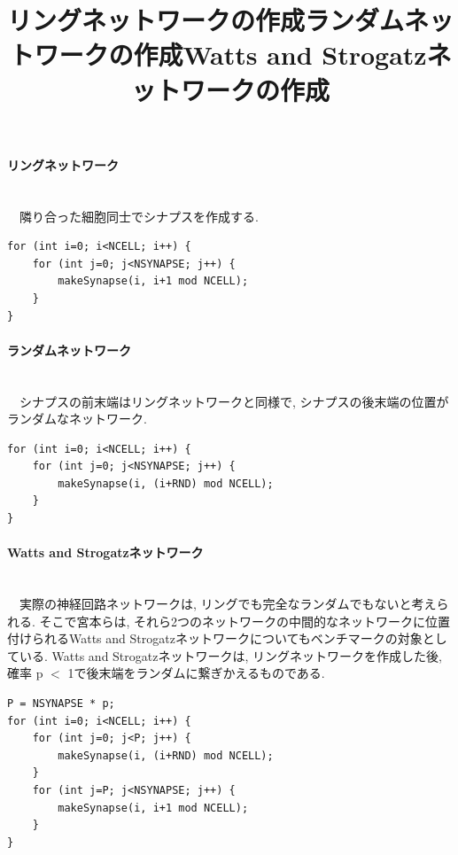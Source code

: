 \paragraph{リングネットワーク}~\\
　隣り合った細胞同士でシナプスを作成する.\\
\begin{table}[htb]
  \begin{center}
\title{リングネットワークの作成}
{\footnotesize
\begin{framed}
\begin{verbatim}
for (int i=0; i<NCELL; i++) {
    for (int j=0; j<NSYNAPSE; j++) {
        makeSynapse(i, i+1 mod NCELL);
    }
}
\end{verbatim}
\end{framed}
}
\end{center}
\end{table}
\vspace{5cm}
\paragraph{ランダムネットワーク}~\\
　シナプスの前末端はリングネットワークと同様で, シナプスの後末端の位置がランダムなネットワーク.
\begin{table}[htb]
  \begin{center}
\title {ランダムネットワークの作成}
{\footnotesize
\begin{framed}
\begin{verbatim}
for (int i=0; i<NCELL; i++) {
    for (int j=0; j<NSYNAPSE; j++) {
        makeSynapse(i, (i+RND) mod NCELL);
    }
}
\end{verbatim}
\end{framed}
}
\end{center}
\end{table}
\paragraph{Watts and Strogatzネットワーク}~\\
　実際の神経回路ネットワークは, リングでも完全なランダムでもないと考えられる.
そこで宮本\cite{miyamoto-master}\cite{miyamoto-master-eng}らは, それら2つのネットワークの中間的なネットワークに位置付けられるWatts and Strogatzネットワークについてもベンチマークの対象としている.
Watts and Strogatzネットワークは, リングネットワークを作成した後, 確率 p $<$ 1で後末端をランダムに繋ぎかえるものである.\\
\begin{table}[htb]
  \begin{center}
\title {Watts and Strogatzネットワークの作成}
{\footnotesize
\begin{framed}
\begin{verbatim}
P = NSYNAPSE * p;
for (int i=0; i<NCELL; i++) {
    for (int j=0; j<P; j++) {
        makeSynapse(i, (i+RND) mod NCELL);
    }
    for (int j=P; j<NSYNAPSE; j++) {
        makeSynapse(i, i+1 mod NCELL);
    }
}
\end{verbatim}
\end{framed}
}
\end{center}
\end{table}
\vspace{1cm}
